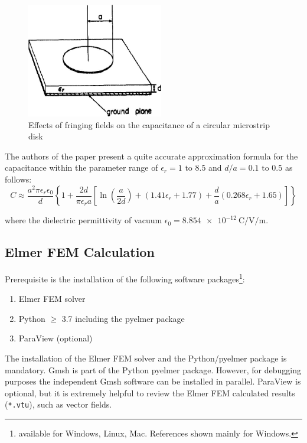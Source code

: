 \documentclass[10pt,a4paper,titlepage]{article}
\begin{document}
\begin{figure}[H]
	\begin{center}
		\includegraphics[width=!, height=5cm, angle=0]{./fig/disk.jpg}
		\caption{Effects of fringing fields on the capacitance of a circular microstrip disk \cite{1130017}}
		\label{3836149517}
	\end{center}
\end{figure}
\noindent
The authors of the paper \cite{1130017} present a quite accurate approximation formula for the capacitance within the parameter range of $\epsilon_r = 1 \text{ to } 8.5$ and $d/a = 0.1 \text{ to } 0.5$ as follows:
\begin{equation}
C \approx \frac{a^2 \pi \epsilon_r \epsilon_0}{d} \left\lbrace  1 + \frac{2d}{\pi \epsilon_r a}   \left[  \ln \left(\frac{a}{2 d}\right) + (1.41 \epsilon_r + 1.77) + \frac{d}{a} (0.268 \epsilon_r + 1.65) \right] \right\rbrace \label{3835945702}	
\end{equation}

\noindent
where the dielectric permittivity of vacuum $\epsilon_0 = \SI{8.854e-12}{\coulomb\per\volt\per\meter}$.

\subsection{Elmer FEM Calculation}


Prerequisite is the installation of the following software packages\footnote{available for Windows, Linux, Mac. References shown mainly for Windows.}:
\begin{enumerate}
	\item Elmer FEM solver \cite{ElmerFEM}
	\item Python $\geq$ 3.7 \cite{WinPython} including the pyelmer package \cite{pyelmer}
	\item ParaView \cite{ParaView} (optional)
\end{enumerate}

\noindent
The installation of the Elmer FEM solver and the Python/pyelmer package is mandatory. Gmsh is part of the Python pyelmer package. However, for debugging purposes the independent Gmsh software can be installed in parallel.
ParaView is optional, but it is extremely helpful to review the Elmer FEM calculated results (\verb|*.vtu|), such as vector fields.
\end{document}
